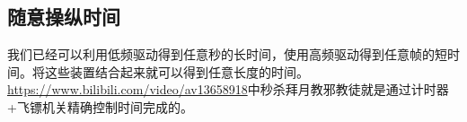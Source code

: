 



\subsection{随意操纵时间}
我们已经可以利用低频驱动得到任意秒的长时间，使用高频驱动得到任意帧的短时间。将这些装置结合起来就可以得到任意长度的时间。\url{https://www.bilibili.com/video/av13658918}中秒杀拜月教邪教徒就是通过计时器+飞镖机关精确控制时间完成的。

